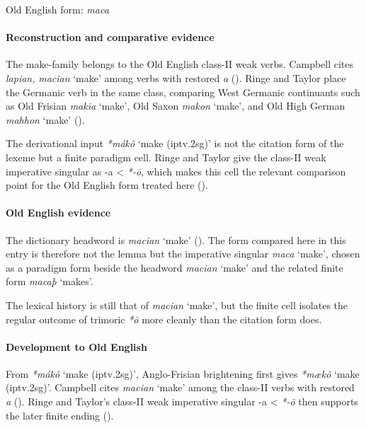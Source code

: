 \documentclass[
  british,
  a4paper,
]{article}
\providecommand{\Recon}[1]{\emph{*#1}}
\begin{document}
Old English form: \emph{maca}

\paragraph{Reconstruction and comparative
evidence}\label{reconstruction-and-comparative-evidence-137}

The make-family belongs to the Old English class-II weak verbs. Campbell
cites \emph{lapian,} {\emph{macian}} `make' among verbs with restored
\emph{a} (). Ringe
and Taylor place the Germanic verb in the same class, comparing West
Germanic continuants such as Old Frisian {\emph{makia}} `make', Old
Saxon {\emph{makon}} `make', and Old High German {\emph{mahhon}} `make'
().

The derivational input \Recon{mákô} `make (iptv.2sg)' is not the
citation form of the lexeme but a finite paradigm cell. Ringe and Taylor
give the class-II weak imperative singular as -a \textless{} \emph{*-ō},
which makes this cell the relevant comparison point for the Old English
form treated here ().

\paragraph{Old English evidence}\label{old-english-evidence-139}

The dictionary headword is {\emph{macian}} `make'
(). The form compared
here in this entry is therefore not the lemma but the imperative
singular {\emph{maca}} `make', chosen as a paradigm form beside the
headword {\emph{macian}} `make' and the related finite form
{\emph{macaþ}} `makes'.

The lexical history is still that of \emph{macian} `make', but the
finite cell isolates the regular outcome of trimoric \emph{*ō} more
cleanly than the citation form does.

\paragraph{Development to Old
English}\label{development-to-old-english-137}

From \Recon{mákô} `make (iptv.2sg)', Anglo-Frisian brightening first
gives \Recon{mækô} `make (iptv.2sg)'. Campbell cites \emph{macian}
`make' among the class-II verbs with restored \emph{a}
(). Ringe and
Taylor's class-II weak imperative singular -a \textless{} \emph{*-ō}
then supports the later finite ending
().
\end{document}
